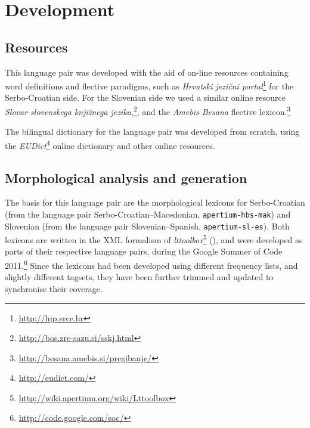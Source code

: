 \section{Development}

\subsection{Resources}
This language pair was developed with the
aid of on-line resources containing word definitions and flective
paradigms, such as \emph{Hrvatski jezični
  portal}\footnote{\url{http://hjp.srce.hr}} for the Serbo-Croatian side. For
the Slovenian side we used a similar online resource \emph{Slovar
  slovenskega knjižnega
  jezika},\footnote{\url{http://bos.zrc-sazu.si/sskj.html}}, and the
\emph{Amebis Besana} flective
lexicon.\footnote{\url{http://besana.amebis.si/pregibanje/}}

The bilingual dictionary for the language pair was developed from scratch,
using the \emph{EUDict}\footnote{\url{http://eudict.com/}} online
dictionary and other online resources.

\subsection{Morphological analysis and generation}
The basis for this language pair are the morphological
lexicons for Serbo-Croatian (from
the language pair Serbo-Croatian--Macedonian, {\small{\tt apertium-hbs-mak}}) and Slovenian (from the
language pair Slovenian--Spanish, {\small{\tt apertium-sl-es}}). Both
lexicons are written in the XML formalism of
\emph{lttoolbox}\footnote{\url{http://wiki.apertium.org/wiki/Lttoolbox}}
(\citealp{rojas2005construccion}), and were developed as parts of
their respective language pairs, during the Google Summer of Code
2011.\footnote{\url{http://code.google.com/soc/}} Since the lexicons
had been developed using different frequency lists, and slightly
different tagsets, they have been further trimmed and updated to
synchronise their coverage.









